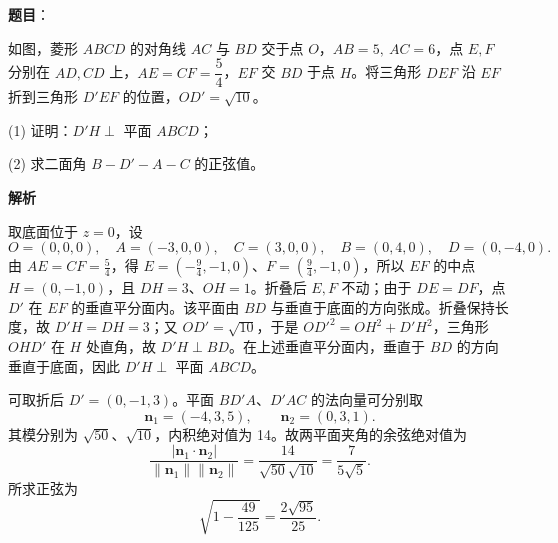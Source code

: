 \begin{answer}

\textbf{题目}：

如图，菱形 \(ABCD\) 的对角线 \(AC\) 与 \(BD\) 交于点 \(O\)，\(AB=5,\ AC=6\)，点 \(E,F\) 分别在 \(AD,CD\) 上，\(AE=CF=\dfrac54\)，\(EF\) 交 \(BD\) 于点 \(H\)。将三角形 \(DEF\) 沿 \(EF\) 折到三角形 \(D'EF\) 的位置，\(OD'=\sqrt{10}\)。
\nopagebreak[4]
\begin{center}\end{center}
\nopagebreak[4]
   (1) 证明：\(D'H\perp\) 平面 \(ABCD\)；

   (2) 求二面角 \(B-D'-A-C\) 的正弦值。

\textbf{解析}


取底面位于 \(z=0\)，设
\nopagebreak[4]
\[
O=(0,0,0),\quad A=(-3,0,0),\quad C=(3,0,0),\quad B=(0,4,0),\quad D=(0,-4,0).
\]
由 \(AE=CF=\frac54\)，得 \(E=(-\frac94,-1,0)\)、\(F=(\frac94,-1,0)\)，所以 \(EF\) 的中点 \(H=(0,-1,0)\)，且 \(DH=3\)、\(OH=1\)。折叠后 \(E,F\) 不动；由于 \(DE=DF\)，点 \(D'\) 在 \(EF\) 的垂直平分面内。该平面由 \(BD\) 与垂直于底面的方向张成。折叠保持长度，故 \(D'H=DH=3\)；又 \(OD'=\sqrt{10}\)，于是 \(OD'^2=OH^2+D'H^2\)，三角形 \(OHD'\) 在 \(H\) 处直角，故 \(D'H\perp BD\)。在上述垂直平分面内，垂直于 \(BD\) 的方向垂直于底面，因此 \(D'H\perp\) 平面 \(ABCD\)。


可取折后 \(D'=(0,-1,3)\)。平面 \(BD'A\)、\(D'AC\) 的法向量可分别取
\nopagebreak[4]
\[
\boldsymbol n_1=(-4,3,5),\qquad \boldsymbol n_2=(0,3,1).
\]
其模分别为 \(\sqrt{50}\)、\(\sqrt{10}\)，内积绝对值为 14。故两平面夹角的余弦绝对值为
\nopagebreak[4]
\[
\frac{|\boldsymbol n_1\cdot\boldsymbol n_2|}{\|\boldsymbol n_1\|\|\boldsymbol n_2\|}=\frac{14}{\sqrt{50}\sqrt{10}}=\frac7{5\sqrt5}.
\]
所求正弦为
\nopagebreak[4]
\[
\sqrt{1-\frac{49}{125}}=\frac{2\sqrt{95}}{25}.
\]



\end{answer}
